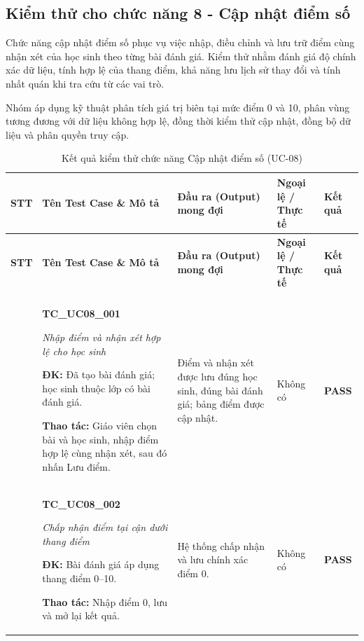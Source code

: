 \subsection{Kiểm thử cho chức năng 8 - Cập nhật điểm số}
Chức năng cập nhật điểm số phục vụ việc nhập, điều chỉnh và lưu trữ điểm cùng nhận xét của học sinh theo từng bài đánh giá. Kiểm thử nhằm đánh giá độ chính xác dữ liệu, tính hợp lệ của thang điểm, khả năng lưu lịch sử thay đổi và tính nhất quán khi tra cứu từ các vai trò.

Nhóm áp dụng kỹ thuật phân tích giá trị biên tại mức điểm 0 và 10, phân vùng tương đương với dữ liệu không hợp lệ, đồng thời kiểm thử cập nhật, đồng bộ dữ liệu và phân quyền truy cập.

\begin{longtable}{|>{\centering\arraybackslash}p{0.8cm}|>{\raggedright\arraybackslash}p{4.6cm}|>{\raggedright\arraybackslash}p{3.8cm}|>{\raggedright\arraybackslash}p{3.8cm}|>{\centering\arraybackslash}p{1.5cm}|}
\caption{Kết quả kiểm thử chức năng Cập nhật điểm số (UC-08)}\label{tab:academic-uc08}\\
\hline
\textbf{STT} & \textbf{Tên Test Case \& Mô tả} & \textbf{Đầu ra (Output) mong đợi} & \textbf{Ngoại lệ / Thực tế} & \textbf{Kết quả} \\ \hline
\endfirsthead
\hline
\textbf{STT} & \textbf{Tên Test Case \& Mô tả} & \textbf{Đầu ra (Output) mong đợi} & \textbf{Ngoại lệ / Thực tế} & \textbf{Kết quả} \\ \hline
\endhead
\hline \multicolumn{5}{r}{\scriptsize\itshape Xem tiếp ở trang sau} \\
\endfoot
\hline
\endlastfoot
1 & \textbf{TC\_UC08\_001}\par \textit{Nhập điểm và nhận xét hợp lệ cho học sinh}\par \textbf{ĐK:} Đã tạo bài đánh giá; học sinh thuộc lớp có bài đánh giá.\par \textbf{Thao tác:} Giáo viên chọn bài và học sinh, nhập điểm hợp lệ cùng nhận xét, sau đó nhấn Lưu điểm. & Điểm và nhận xét được lưu đúng học sinh, đúng bài đánh giá; bảng điểm được cập nhật. & Không có & \textbf{PASS} \\ \hline
2 & \textbf{TC\_UC08\_002}\par \textit{Chấp nhận điểm tại cận dưới thang điểm}\par \textbf{ĐK:} Bài đánh giá áp dụng thang điểm 0--10.\par \textbf{Thao tác:} Nhập điểm 0, lưu và mở lại kết quả. & Hệ thống chấp nhận và lưu chính xác điểm 0. & Không có & \textbf{PASS} \\ \hline

\end{longtable}
